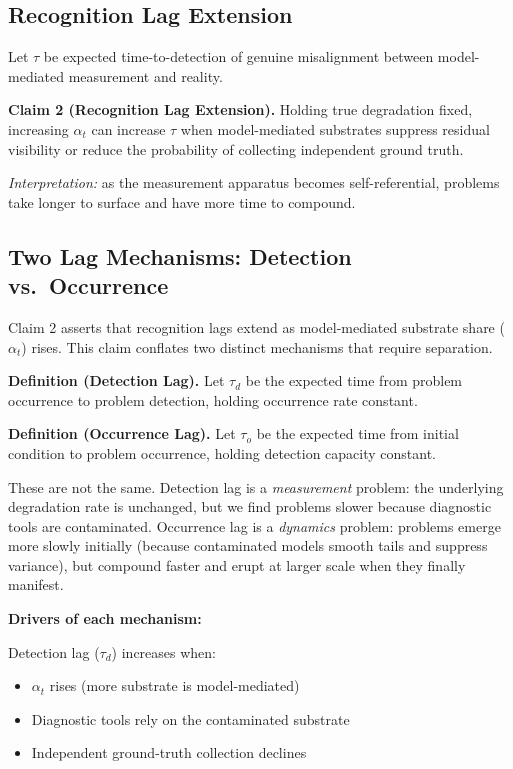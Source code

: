 \documentclass[11pt,a4paper]{article}
\providecommand{\tightlist}{\setlength{\itemsep}{0pt}\setlength{\parskip}{0pt}}
\begin{document}
\hypertarget{recognition-lag-extension}{%
\subsection{ Recognition Lag Extension}\label{recognition-lag-extension}}

Let $\tau$ be expected time-to-detection of genuine misalignment between model-mediated measurement and reality.

\textbf{Claim 2 (Recognition Lag Extension).} Holding true degradation fixed, increasing $\alpha_{t}$ can increase $\tau$ when model-mediated substrates suppress residual visibility or reduce the probability of collecting independent ground truth.

\emph{Interpretation:} as the measurement apparatus becomes self-referential, problems take longer to surface and have more time to compound.

\hypertarget{two-lag-mechanisms-detection-vs.-occurrence}{%
\subsection{ Two Lag Mechanisms: Detection vs.~Occurrence}\label{two-lag-mechanisms-detection-vs.-occurrence}}

Claim 2 asserts that recognition lags extend as model-mediated substrate share ($\alpha_{t}$) rises. This claim conflates two distinct mechanisms that require separation.

\textbf{Definition (Detection Lag).} Let $\tau_{d}$ be the expected time from problem occurrence to problem detection, holding occurrence rate constant.

\textbf{Definition (Occurrence Lag).} Let $\tau_{o}$ be the expected time from initial condition to problem occurrence, holding detection capacity constant.

These are not the same. Detection lag is a \emph{measurement} problem: the underlying degradation rate is unchanged, but we find problems slower because diagnostic tools are contaminated. Occurrence lag is a \emph{dynamics} problem: problems emerge more slowly initially (because contaminated models smooth tails and suppress variance), but compound faster and erupt at larger scale when they finally manifest.

\textbf{Drivers of each mechanism:}

Detection lag ($\tau_{d}$) increases when:

\begin{itemize}
\tightlist
\item
  $\alpha_{t}$ rises (more substrate is model-mediated)
\item
  Diagnostic tools rely on the contaminated substrate
\item
  Independent ground-truth collection declines
\end{itemize}
\end{document}
